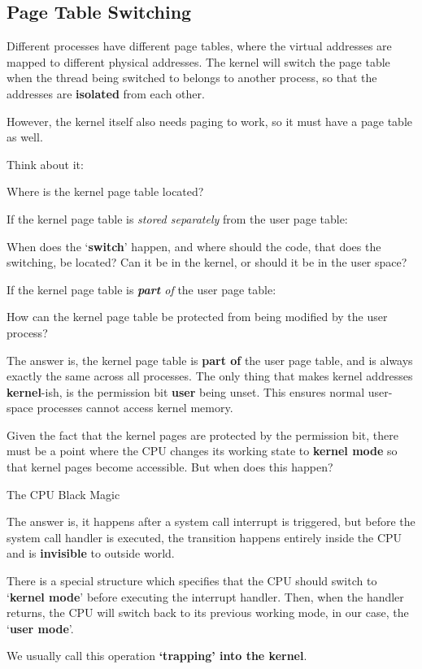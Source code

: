 \subsection{Page Table Switching}

Different processes have different page tables, where the virtual addresses are
mapped to different physical addresses. The kernel will switch the page table
when the thread being switched to belongs to another process, so that the addresses
are \textbf{isolated} from each other.

However, the kernel itself also needs paging to work, so it must have a page table
as well.

\begin{exercise*}{Think about it:}
    \item Where is the kernel page table located?
    \item If the kernel page table is \textit{stored separately} from the user page table:

    When does the `\textbf{switch}' happen, and where should the code, that
    does the switching, be located? Can it be in the kernel, or should it be
    in the user space?

    \item If the kernel page table is \textit{\textbf{part} of} the user page table:

    How can the kernel page table be protected from being modified by the user
    process?
\end{exercise*}

The answer is, the kernel page table is \textbf{part of} the user page table, and
is always exactly the same across all processes. The only thing that makes kernel
addresses \textbf{kernel}-ish, is the permission bit \textbf{user} being unset.
This ensures normal user-space processes cannot access kernel memory.

Given the fact that the kernel pages are protected by the permission bit, there must
be a point where the CPU changes its working state to \textbf{kernel mode} so that
kernel pages become accessible. But when does this happen?

\begin{note*}{The CPU Black Magic}
    \item The answer is, it happens after a system call interrupt is triggered,
    but before the system call handler is executed, the transition happens
    entirely inside the CPU and is \textbf{invisible} to outside world.

    \item There is a special structure which specifies that the CPU should
    switch to `\textbf{kernel mode}' before executing the interrupt handler.
    Then, when the handler returns, the CPU will switch back to its previous
    working mode, in our case, the `\textbf{user mode}'.

    \item We usually call this operation \textbf{`trapping' into the kernel}.
\end{note*}

